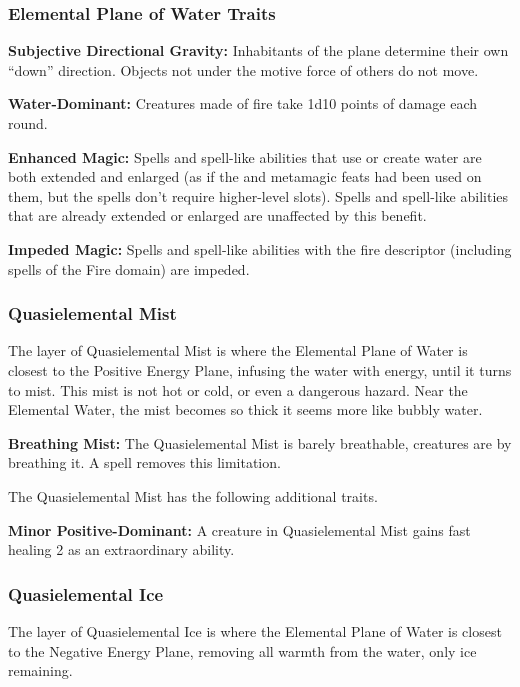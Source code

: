 \subsubsection{Elemental Plane of Water Traits}
\begin{itemize*}
\item \textbf{Subjective Directional Gravity:} Inhabitants of the plane determine their own ``down'' direction. Objects not under the motive force of others do not move.
\item \textbf{Water-Dominant:} Creatures made of fire take 1d10 points of damage each round.
\item \textbf{Enhanced Magic:} Spells and spell-like abilities that use or create water are both extended and enlarged (as if the  and  metamagic feats had been used on them, but the spells don't require higher-level slots). Spells and spell-like abilities that are already extended or enlarged are unaffected by this benefit.
\item \textbf{Impeded Magic:} Spells and spell-like abilities with the fire descriptor (including spells of the Fire domain) are impeded.
\end{itemize*}


\subsubsection{Quasielemental Mist}
The layer of Quasielemental Mist is where the Elemental Plane of Water is closest to the Positive Energy Plane, infusing the water with energy, until it turns to mist. This mist is not hot or cold, or even a dangerous hazard. Near the Elemental Water, the mist becomes so thick it seems more like bubbly water.

\textbf{Breathing Mist:} The Quasielemental Mist is barely breathable, creatures are  by breathing it. A  spell removes this limitation.

The Quasielemental Mist has the following additional traits.
\begin{itemize*}
\item \textbf{Minor Positive-Dominant:} A creature in Quasielemental Mist gains fast healing 2 as an extraordinary ability.
\end{itemize*}

\subsubsection{Quasielemental Ice}
The layer of Quasielemental Ice is where the Elemental Plane of Water is closest to the Negative Energy Plane, removing all warmth from the water, only ice remaining.

